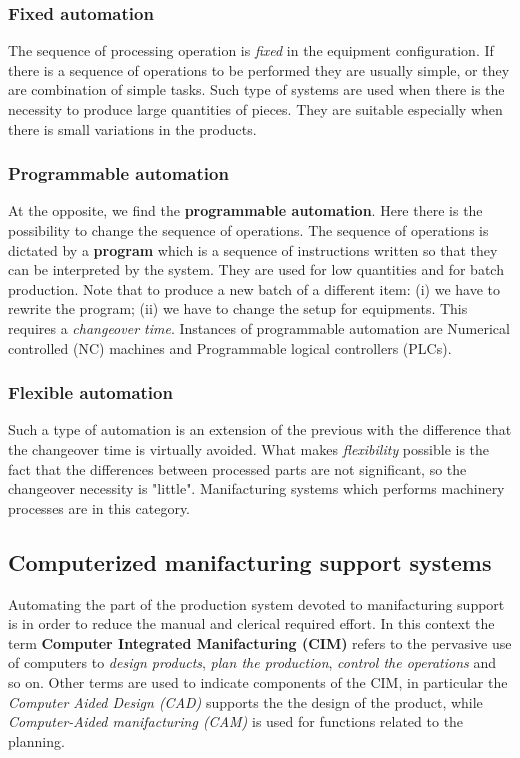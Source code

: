 \subsubsection{Fixed automation}
The sequence of processing operation is \textit{fixed} in the equipment configuration. If there is a sequence of operations to be performed they are usually simple, or they are combination of simple tasks. Such type of systems are used when there is the necessity to produce large quantities of pieces. They are suitable especially when there is small variations in the products.
\subsubsection{Programmable automation}
At the opposite, we find the \textbf{programmable automation}. Here there is the possibility to change the sequence of operations. The sequence of operations is dictated by a \textbf{program} which is a sequence of instructions written so that they can be interpreted by the system. They are used for low quantities and for batch production. Note that to produce a new batch of a different item: (i) we have to rewrite the program; (ii) we have to change the setup for equipments. This requires a \textit{changeover time}. Instances of programmable automation are Numerical controlled (NC) machines and Programmable logical controllers (PLCs).

\subsubsection{Flexible automation}
Such a type of automation is an extension of the previous with the difference that the changeover time is virtually avoided. What makes \textit{flexibility} possible is the fact that the differences between processed parts are not significant, so the changeover necessity is "little". Manifacturing systems which performs machinery processes are in this category.

\subsection{Computerized manifacturing support systems}
Automating the part of the production system devoted to manifacturing support is in order to reduce the manual and clerical required effort. In this context the term \textbf{Computer Integrated Manifacturing (CIM)} refers to the pervasive use of computers to \textit{design products}, \textit{plan the production}, \textit{control the operations} and so on. Other terms are used to indicate components of the CIM, in particular the \textit{Computer Aided Design (CAD)} supports the the design of the product, while \textit{Computer-Aided manifacturing (CAM)} is used for functions related to the planning.\\

